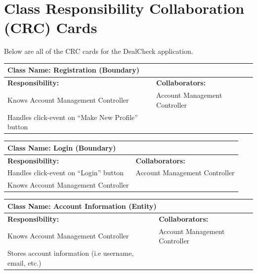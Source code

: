 \documentclass[]{article}
\begin{document}


\pagebreak

\section{Class Responsibility Collaboration (CRC) Cards}
\label{sec:class_responsibility_collaboration_crc_cards}
Below are all of the CRC cards for the DealCheck application.

\begin{table}[H]
  \centering
  \renewcommand{\arraystretch}{1.3} %
  \begin{tabular}{|p{7.5cm}|p{7.5cm}|}
    \hline
    \multicolumn{2}{|l|}{\textbf{Class Name: Registration (Boundary)}}               \\
    \hline
    \textbf{Responsibility:}                         & \textbf{Collaborators:}       \\
    \hline
    Knows Account Management Controller              & Account Management Controller \\
    Handles click-event on “Make New Profile” button &                               \\
    \hline
  \end{tabular}
\end{table}
\begin{table}[H]
  \centering
  \renewcommand{\arraystretch}{1.3} %
  \begin{tabular}{|p{7.5cm}|p{7.5cm}|}
    \hline
    \multicolumn{2}{|l|}{\textbf{Class Name: Login (Boundary)}}           \\
    \hline
    \textbf{Responsibility:}              & \textbf{Collaborators:}       \\
    \hline
    Handles click-event on “Login” button & Account Management Controller \\
    Knows Account Management Controller   &                               \\
    \hline
  \end{tabular}
\end{table}
\begin{table}[H]
  \centering
  \renewcommand{\arraystretch}{1.3} %
  \begin{tabular}{|p{7.5cm}|p{7.5cm}|}
    \hline
    \multicolumn{2}{|l|}{\textbf{Class Name: Account Information (Entity)}}                \\
    \hline
    \textbf{Responsibility:}                               & \textbf{Collaborators:}       \\
    \hline
    Knows Account Management Controller                    & Account Management Controller \\
    Stores account information (i.e username, email, etc.) &                               \\
    \hline
  \end{tabular}
\end{table}
\end{document}
